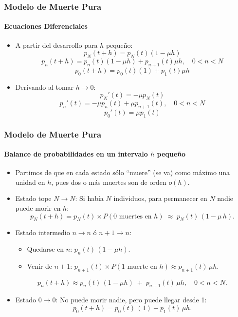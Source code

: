 \documentclass{beamer}
\begin{document}
\begin{frame}
\frametitle{Modelo de Muerte Pura}
\framesubtitle{Ecuaciones Diferenciales}

\begin{itemize}
    \item A partir del desarrollo para $h$ pequeño:
    \[
    p_N(t + h) = p_N(t)(1 - \mu h)
    \]
    \[
    p_n(t + h) = p_n(t)(1 - \mu h) + p_{n+1}(t)\mu h, \quad 0 < n < N
    \]
    \[
    p_0(t + h) = p_0(t)(1) + p_1(t)\mu h
    \]

    \item Derivando al tomar $h \to 0$:
    \[
    p_N'(t) = -\mu p_N(t)
    \]
    \[
    p_n'(t) = -\mu p_n(t) + \mu p_{n+1}(t), \quad 0 < n < N
    \]
    \[
    p_0'(t) = \mu p_1(t)
    \]
\end{itemize}
\end{frame}

\begin{frame}
\frametitle{Modelo de Muerte Pura}
\framesubtitle{Balance de probabilidades en un intervalo $h$ pequeño}

\begin{itemize}
  \item Partimos de que en cada estado sólo “muere” (se va) como máximo una unidad en $h$, pues dos o más muertes son de orden $o(h)$.
  \medskip
  \item Estado tope \(N\to N\):  
    Si había \(N\) individuos, para permanecer en \(N\) nadie puede morir en $h$:
    \[
      p_N(t+h)
      = p_N(t)\times P(0\text{ muertes en }h)
      \;\approx\; p_N(t)\,(1-\mu\,h).
    \]
  \medskip
  \item Estado intermedio \(n\to n\) ó \(n+1\to n\):  
  \begin{itemize}
    \item Quedarse en \(n\): \(p_n(t)\,(1-\mu h)\).  
    \item Venir de \(n+1\): \(p_{n+1}(t)\times P(1\text{ muerte en }h)\approx p_{n+1}(t)\,\mu h\).
  \end{itemize}
    \[
      p_n(t+h)
      \approx p_n(t)\,(1-\mu h)
      \;+\;
      p_{n+1}(t)\,\mu h,
      \quad 0<n<N.
    \]
  \medskip
  \item Estado \(0\to0\):  
    No puede morir nadie, pero puede llegar desde 1:
    \[
      p_0(t+h)
      = p_0(t)\,(1)
      + p_1(t)\,\mu h.
    \]
\end{itemize}
\end{frame}
\end{document}
